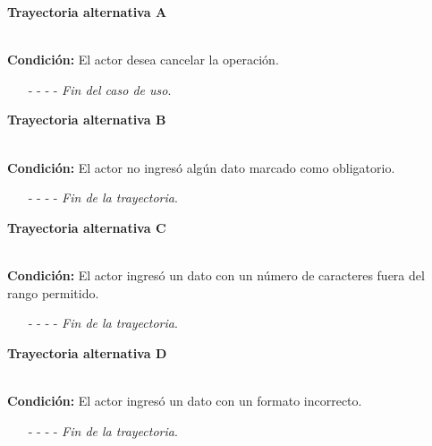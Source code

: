 \hypertarget{CU11-1-1:TAA}{\textbf{Trayectoria alternativa A}}\\
\noindent \textbf{Condición:} El actor desea cancelar la operación.
\begin{enumerate}
	\UCpaso[\UCactor] Solicita cancelar la operación oprimiendo el botón  de la pantalla .
	\UCpaso[\UCsist] Muestra la pantalla  o .
	\item[- -] - - {\em {Fin del caso de uso}}.%
\end{enumerate}
\hypertarget{CU11-1-1:TAB}{\textbf{Trayectoria alternativa B}}\\
\noindent \textbf{Condición:} El actor no ingresó algún dato marcado como obligatorio.
\begin{enumerate}
	\UCpaso[\UCsist] Muestra el mensaje  señalando el campo que presenta el error en la pantalla .
	\UCpaso Regresa al paso \ref{CU11.1.1-P3} de la trayectoria principal.
	\item[- -] - - {\em {Fin de la trayectoria}}.%
\end{enumerate}
\hypertarget{CU11-1-1:TAC}{\textbf{Trayectoria alternativa C}}\\
\noindent \textbf{Condición:} El actor ingresó un dato con un número de caracteres fuera del rango permitido.
\begin{enumerate}
	\UCpaso[\UCsist] Muestra el mensaje  señalando el campo que presenta el error en la pantalla .
	\UCpaso Regresa al paso \ref{CU11.1.1-P3} de la trayectoria principal.
	\item[- -] - - {\em {Fin de la trayectoria}}.%
\end{enumerate}
\hypertarget{CU11-1-1:TAD}{\textbf{Trayectoria alternativa D}}\\
\noindent \textbf{Condición:} El actor ingresó un dato con un formato incorrecto.
\begin{enumerate}
	\UCpaso[\UCsist] Muestra el mensaje  señalando el campo que presenta el error en la pantalla .
	\UCpaso Regresa al paso \ref{CU11.1.1-P3} de la trayectoria principal.
	\item[- -] - - {\em {Fin de la trayectoria}}.
\end{enumerate}
